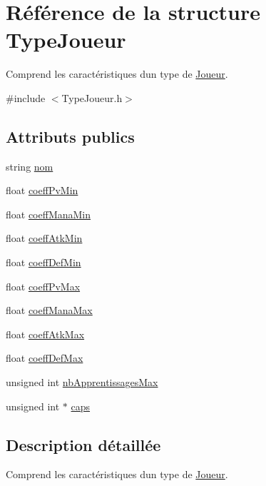 \hypertarget{structTypeJoueur}{}\section{Référence de la structure Type\+Joueur}
\label{structTypeJoueur}


Comprend les caractéristiques d\textquotesingle{}un type de \mbox{\hyperlink{classJoueur}{Joueur}}.  




{\ttfamily \#include $<$Type\+Joueur.\+h$>$}

\subsection*{Attributs publics}
\begin{DoxyCompactItemize}
\item 
string \mbox{\hyperlink{structTypeJoueur_a66919412973844922efebb6b0a0a95b8}{nom}}
\item 
float \mbox{\hyperlink{structTypeJoueur_abdaca872c129dc3d31a9e2aa23d994f6}{coeff\+Pv\+Min}}
\item 
float \mbox{\hyperlink{structTypeJoueur_a3ad5af235c91cc96e6fac4886a2ff8b0}{coeff\+Mana\+Min}}
\item 
float \mbox{\hyperlink{structTypeJoueur_afaf6b4017f0bf253544c4c13406bc6ca}{coeff\+Atk\+Min}}
\item 
float \mbox{\hyperlink{structTypeJoueur_a02b4dc5d0f6165cbfa7beb6814909a71}{coeff\+Def\+Min}}
\item 
float \mbox{\hyperlink{structTypeJoueur_a68bb43ea61e33dd320a0aff87c9463b4}{coeff\+Pv\+Max}}
\item 
float \mbox{\hyperlink{structTypeJoueur_a372a71f7a1fa2477f25369ffa6bccf00}{coeff\+Mana\+Max}}
\item 
float \mbox{\hyperlink{structTypeJoueur_a913539852155d8d9cd7a6bf701924ea2}{coeff\+Atk\+Max}}
\item 
float \mbox{\hyperlink{structTypeJoueur_a4d1bbb9bc416de504f8cfe6c16fb4993}{coeff\+Def\+Max}}
\item 
unsigned int \mbox{\hyperlink{structTypeJoueur_ac57617d27d138c78f338f78a359a77dd}{nb\+Apprentissages\+Max}}
\item 
unsigned int $\ast$ \mbox{\hyperlink{structTypeJoueur_a360f632afa23803fc525c5c58368cbb4}{caps}}
\end{DoxyCompactItemize}


\subsection{Description détaillée}
Comprend les caractéristiques d\textquotesingle{}un type de \mbox{\hyperlink{classJoueur}{Joueur}}. 

